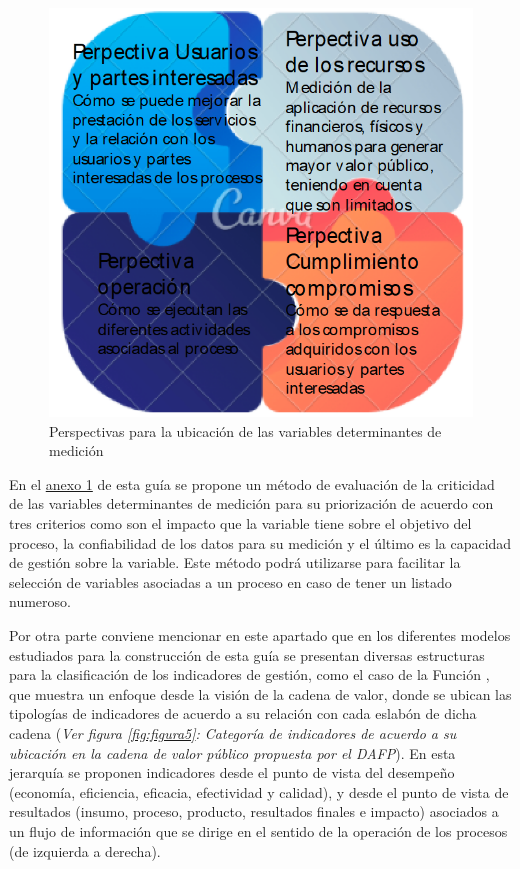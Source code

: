 \documentclass[
]{book}
\begin{document}
\begin{figure}

{\centering \includegraphics[width=0.6\linewidth]{Imagenes/figura_4} 

}

\caption{Perspectivas para la ubicación de las variables determinantes de medición }\label{fig:figura4}
\end{figure}

En el \protect\hyperlink{anexos}{anexo 1} de esta guía se propone un método de evaluación de la criticidad de las variables determinantes de medición para su priorización de acuerdo con tres criterios como son el impacto que la variable tiene sobre el objetivo del proceso, la confiabilidad de los datos para su medición y el último es la capacidad de gestión sobre la variable. Este método podrá utilizarse para facilitar la selección de variables asociadas a un proceso en caso de tener un listado numeroso.

Por otra parte conviene mencionar en este apartado que en los diferentes modelos estudiados para la construcción de esta guía se presentan diversas estructuras para la clasificación de los indicadores de gestión, como el caso de la Función \citet{publica2015guia}, que muestra un enfoque desde la visión de la cadena de valor, donde se ubican las tipologías de indicadores de acuerdo a su relación con cada eslabón de dicha cadena (\emph{Ver figura \ref{fig:figura5}: Categoría de indicadores de acuerdo a su ubicación en la cadena de valor público propuesta por el DAFP}). En esta jerarquía se proponen indicadores desde el punto de vista del desempeño (economía, eficiencia, eficacia, efectividad y calidad), y desde el punto de vista de resultados (insumo, proceso, producto, resultados finales e impacto) asociados a un flujo de información que se dirige en el sentido de la operación de los procesos (de izquierda a derecha).
\end{document}
